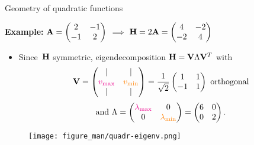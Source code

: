 \documentclass[11pt,compress,t,notes=noshow, xcolor=table]{beamer}
\begin{document}
\begin{vbframe}{Geometry of quadratic functions}
  
\textbf{Example:} $\mathbf{A} = \begin{pmatrix} 2 & -1 \\ -1 & 2\end{pmatrix}$ $\implies$ $\mathbf{H} = 2\mathbf{A} = \begin{pmatrix} 4 & -2 \\ -2 & 4\end{pmatrix}$

\begin{itemize}
    \item Since~$\mathbf{H}$ symmetric, eigendecomposition $\mathbf{H} = \mathbf{V}\Lambda\mathbf{V}^T$ with
        \begin{equation*}
            \mathbf{V} = \begin{pmatrix}
                    | & | \\
                    \textcolor{magenta}{v_\text{max}} & \textcolor{orange}{v_\text{min}} \\
                    | & |
                \end{pmatrix}
                = \frac{1}{\sqrt{2}} \begin{pmatrix}
                    1 & 1 \\
                    -1 & 1
                \end{pmatrix}
            \text{ orthogonal}
        \end{equation*}
        \begin{equation*}
            \text{and }
            \Lambda = \begin{pmatrix}
                \textcolor{magenta}{\lambda_\text{max}} & 0 \\
                0 & \textcolor{orange}{\lambda_\text{min}}
            \end{pmatrix}
            = \begin{pmatrix}6 & 0 \\ 0 & 2\end{pmatrix}.
        \end{equation*}
\end{itemize}

\vspace{-0.5\baselineskip}

\begin{figure}
    \texttt{[image: figure\_man/quadr-eigenv.png]}
\end{figure}
  

\end{vbframe}
\end{document}
